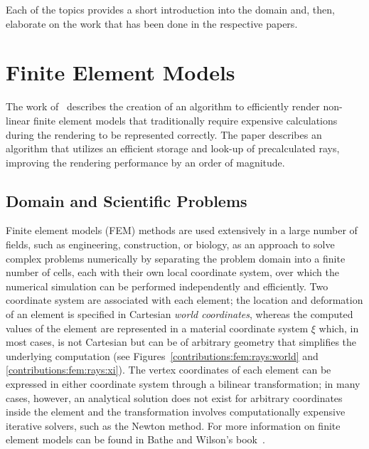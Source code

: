 Each of the topics provides a short introduction into the domain and, then, elaborate on the work that has been done in the respective papers.





\section{Finite Element Models} \label{contributions:fem}
The work of \paperFEM\ describes the creation of an algorithm to efficiently render non-linear finite element models that traditionally require expensive calculations during the rendering to be represented correctly.  The paper describes an algorithm that utilizes an efficient storage and look-up of precalculated rays, improving the rendering performance by an order of magnitude.

\subsection{Domain and Scientific Problems} \label{contributions:fem:background}
Finite element models (FEM) methods are used extensively in a large number of fields, such as engineering, construction, or biology, as an approach to solve complex problems numerically by separating the problem domain into a finite number of cells, each with their own local coordinate system, over which the numerical simulation can be performed independently and efficiently.  Two coordinate system are associated with each element; the location and deformation of an element is specified in Cartesian \emph{world coordinates}, whereas the computed values of the element are represented in a material coordinate system $\xi$ which, in most cases, is not Cartesian but can be of arbitrary geometry that simplifies the underlying computation (see Figures~\ref{contributions:fem:rays:world} and \ref{contributions:fem:rays:xi}).  The vertex coordinates of each element can be expressed in either coordinate system through a bilinear transformation; in many cases, however, an analytical solution does not exist for arbitrary coordinates inside the element and the transformation involves computationally expensive iterative solvers, such as the Newton method.  For more information on finite element models can be found in Bathe and Wilson's book~\cite{bathe1976numerical}.

